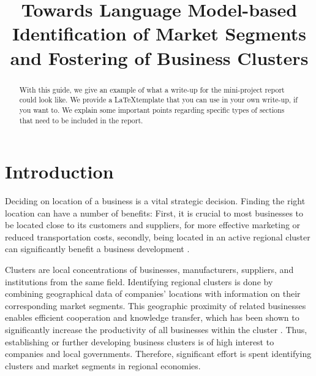 \documentclass[conference]{IEEEtran}
\begin{document}
\title{Towards Language Model-based Identification of Market Segments and Fostering of Business Clusters}

\author{
\and
{}
\and
{}
\and
{}
\and
{}
}

\maketitle

\begin{abstract}
With this guide, we give an example of what a write-up for the mini-project report could look like. We provide a \LaTeX template that you 
can use in your own write-up, if you want to. We explain some important points regarding specific types of sections that need to be included in the report.
\end{abstract}


\section{Introduction}

Deciding on location of a business is a vital strategic decision. Finding the right location can have a number of benefits: First, it is crucial to most businesses to be located close to its customers and suppliers, for more effective marketing or reduced transportation costs, secondly, being located in an active regional cluster can significantly benefit a business development \cite{clustersandcomp,gems-model, regionaladv, clustertheory}. 

Clusters are local concentrations of businesses, manufacturers, suppliers, and institutions from the same field. Identifying regional clusters is done by combining geographical data of companies' locations with information on their corresponding market segments. This geographic proximity of related businesses enables efficient cooperation and knowledge transfer, which has been shown to significantly increase the productivity of all businesses within the cluster \cite{clustersandcomp,gems-model, regionaladv, clustertheory}. Thus, establishing or further developing business clusters is of high interest to companies and local governments. Therefore, significant effort is spent identifying clusters and market segments in regional economies. 
\end{document}
